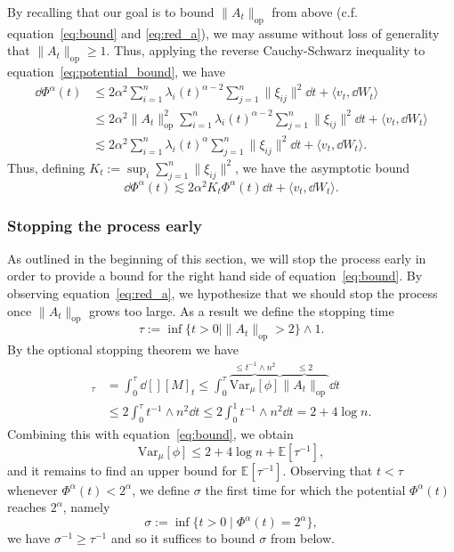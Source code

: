 By recalling that our goal is to bound \(\|A_t\|_{\text{op}}\) from above (c.f. equation~\eqref{eq:bound} and \eqref{eq:red_a}), 
we may assume without loss of generality that \(\|A_t\|_{\text{op}} \ge 1\). Thus, applying the reverse Cauchy-Schwarz inequality to 
equation~\eqref{eq:potential_bound}, we have
\begin{align*}
  \dd \Phi^\alpha(t) & \le 2\alpha^2 \sum_{i = 1}^n \lambda_i(t)^{\alpha - 2} \sum_{j = 1}^n \|\xi_{ij}\|^2 \dd t + \langle v_t, \dd W_t\rangle\\
    & \le 2\alpha^2 \|A_t\|_{\text{op}}^2 \sum_{i = 1}^n \lambda_i(t)^{\alpha - 2} \sum_{j = 1}^n \|\xi_{ij}\|^2 \dd t + \langle v_t, \dd W_t\rangle\\
    & \lesssim 2\alpha^2\sum_{i = 1}^n \lambda_i(t)^\alpha \sum_{j = 1}^n \|\xi_{ij}\|^2 \dd t + \langle v_t, \dd W_t\rangle.
\end{align*} 
Thus, defining \(K_t := \sup_i \sum_{j = 1}^n \|\xi_{ij}\|^2\), we have the asymptotic bound 
\begin{equation}\label{eq:potential_bound_2}
  \dd \Phi^\alpha(t) \lesssim 2\alpha^2 K_t \Phi^\alpha(t) \dd t + \langle v_t, \dd W_t\rangle.
\end{equation}

\subsubsection{Stopping the process early}

As outlined in the beginning of this section, we will stop the process early in order to provide a 
bound for the right hand side of equation~\eqref{eq:bound}. By observing equation~\eqref{eq:red_a}, we hypothesize that
we should stop the process once \(\|A_t\|_{\text{op}}\) grows too large. As a result we define the stopping time 
\[\tau := \inf\{t > 0 \mid \|A_t\|_{\text{op}} > 2\} \wedge 1.\]
By the optional stopping theorem we have
\begin{align*}
  [M]_\tau & = \int_0^\tau \dd[] [M]_t 
      \le \int_0^\tau \overbrace{\text{Var}_\mu[\phi]}^{\le t^{-1} \wedge n^2} \overbrace{\|A_t\|_{\text{op}}}^{\le 2} \dd t\\
    & \le 2 \int_0^\tau t^{-1} \wedge n^2 \dd t \le 2 \int_0^1 t^{-1} \wedge n^2 \dd t = 2 + 4 \log n.
\end{align*}
Combining this with equation~\eqref{eq:bound}, we obtain
\begin{equation}\label{eq:tau_bd}
  \text{Var}_\mu[\phi] \le 2 + 4 \log n + \mathbb{E}[\tau^{-1}],
\end{equation}
and it remains to find an upper bound for \(\mathbb{E}[\tau^{-1}]\). Observing that \(t < \tau\) whenever 
\(\Phi^\alpha(t) < 2^\alpha\), we define \(\sigma\) the first time for which the potential \(\Phi^\alpha(t)\) reaches \(2^\alpha\),
namely
\[\sigma := \inf \{t > 0 \mid \Phi^\alpha(t) = 2^\alpha\},\] 
we have \(\sigma^{-1} \ge \tau^{-1}\) and so it suffices to bound \(\sigma\) from below. 

